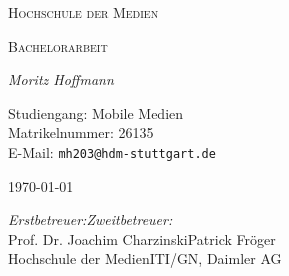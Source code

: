 \documentclass[../main.tex]{subfiles}
\begin{document}

\begin{titlepage}
	\centering
	{\scshape\LARGE
		Hochschule der Medien
	\par}
	\vspace{1cm}
	{\scshape\Large
		Bachelorarbeit
	\par}
	\vspace{1.5cm}
	{\huge\bfseries
		\thema
	\par}
	\vspace{2cm}
	{\Large\itshape
		Moritz Hoffmann
	\par}
	\vspace{0.5cm}
	{\Large
		Studiengang: Mobile Medien\\
		Matrikelnummer: 26135\\
		E-Mail: \texttt{mh203@hdm-stuttgart.de}
	\par}
	\vspace{1.5cm}
	{\Large\today\par}
	\vfill
	{\Large
		\emph{Erstbetreuer:}\hfill\emph{Zweitbetreuer:}\\
		Prof. Dr. Joachim Charzinski\hfill Patrick Fröger\\
		Hochschule der Medien\hfill ITI/GN, Daimler AG
	\par}
\end{titlepage}
\end{document}
